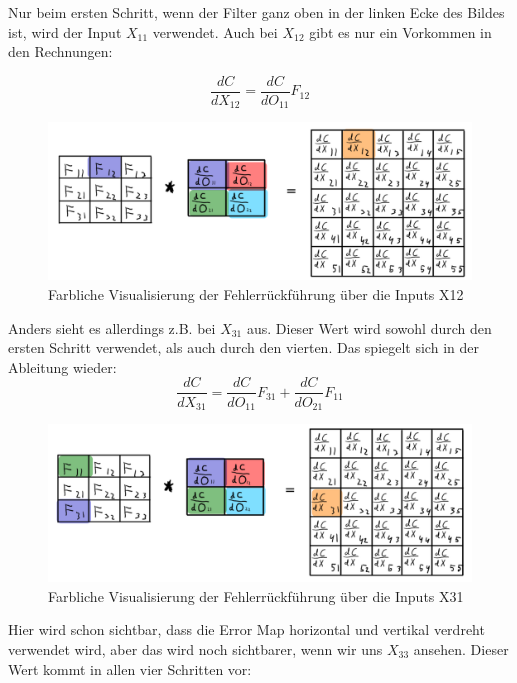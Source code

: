\documentclass[12pt]{article}
\begin{document}
Nur beim ersten Schritt, wenn der Filter ganz oben in der linken Ecke des Bildes ist, wird der Input $X_{11}$ verwendet. Auch bei $X_{12}$ gibt es nur ein Vorkommen in den Rechnungen:

$$\frac {dC} {dX_{12}} = \frac {dC}{dO_{11}} F_{12}$$

\begin{figure}[H]
\centering
\includegraphics[scale=0.27]{Images/017_BackProp_X12.png}
\caption{Farbliche Visualisierung der Fehlerrückführung über die Inputs X12}
\label{Farbliche Visualisierung der Fehlerrückführung über die Inputs X12}
\end{figure}

Anders sieht es allerdings z.B. bei $X_{31}$ aus. Dieser Wert wird sowohl durch den ersten Schritt verwendet, als auch durch den vierten. Das spiegelt sich in der Ableitung wieder:
$$\frac {dC} {dX_{31}} = \frac {dC}{dO_{11}} F_{31} + \frac {dC}{dO_{21}} F_{11}$$

\begin{figure}[H]
\centering
\includegraphics[scale=0.27]{Images/017_BackProp_X31.png}
\caption{Farbliche Visualisierung der Fehlerrückführung über die Inputs X31}
\label{Farbliche Visualisierung der Fehlerrückführung über die Inputs X31}
\end{figure}

Hier wird schon sichtbar, dass die Error Map horizontal und vertikal verdreht verwendet wird, aber das wird noch sichtbarer, wenn wir uns $X_{33}$ ansehen. Dieser Wert kommt in allen vier Schritten vor:
\end{document}
